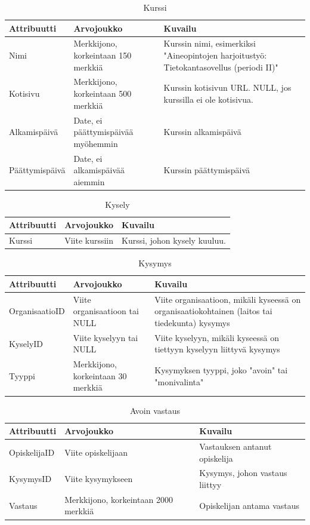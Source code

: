 \documentclass[12pt,a4paper,titlepage]{article}
\begin{document}
\begin{table}[h]
\caption{Kurssi}
\begin{tabularx}{\textwidth}{ |  l X X  |}
  \hline
  Attribuutti & Arvojoukko & Kuvailu \\
  \hline
  Nimi & Merkkijono, korkeintaan 150 merkkiä & Kurssin nimi, esimerkiksi "Aineopintojen harjoitustyö: Tietokantasovellus (periodi II)" \\
  Kotisivu & Merkkijono, korkeintaan 500 merkkiä & Kurssin kotisivun URL. NULL, jos kurssilla ei ole kotisivua. \\
  Alkamispäivä & Date, ei päättymispäivää myöhemmin & Kurssin alkamispäivä \\
  Päättymispäivä & Date, ei alkamispäivää aiemmin & Kurssin päättymispäivä \\
  \hline
\end{tabularx}
\end{table}


\begin{table}[h]
\caption{Kysely}
\begin{tabularx}{\textwidth}{ |  l X X  |}
  \hline
  Attribuutti & Arvojoukko & Kuvailu \\
  \hline
  Kurssi & Viite kurssiin & Kurssi, johon kysely kuuluu. \\
  \hline
\end{tabularx}
\end{table}

\begin{table}[h]
\caption{Kysymys}
\begin{tabularx}{\textwidth}{ |  l X X  |}
  \hline
  Attribuutti & Arvojoukko & Kuvailu \\
  \hline
  OrganisaatioID & Viite organisaatioon tai NULL & Viite organisaatioon, mikäli kyseessä on organisaatiokohtainen (laitos tai tiedekunta) kysymys \\
  KyselyID & Viite kyselyyn tai NULL & Viite kyselyyn, mikäli kyseessä on tiettyyn kyselyyn liittyvä kysymys \\
  Tyyppi & Merkkijono, korkeintaan 30 merkkiä & Kysymyksen tyyppi, joko "avoin" tai "monivalinta"\\
  \hline
\end{tabularx}
\end{table}

\begin{table}[h]
\caption{Avoin vastaus}
\begin{tabularx}{\textwidth}{ |  l X X  |}
  \hline
  Attribuutti & Arvojoukko & Kuvailu \\
  \hline
  OpiskelijaID & Viite opiskelijaan & Vastauksen antanut opiskelija \\
  KysymysID & Viite kysymykseen & Kysymys, johon vastaus liittyy \\
  Vastaus & Merkkijono, korkeintaan 2000 merkkiä & Opiskelijan antama vastaus \\
  \hline
\end{tabularx}
\end{table}
\end{document}
